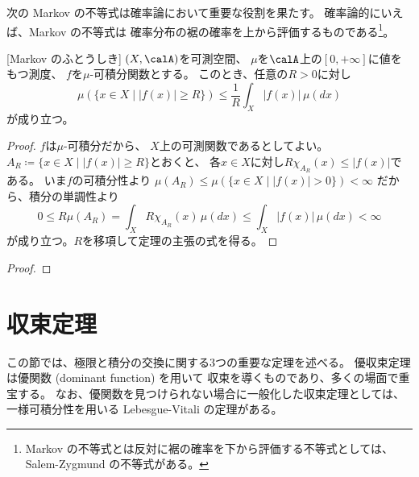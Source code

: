 \documentclass[report]{jlreq}
\begin{document}
次の Markov の不等式は確率論において重要な役割を果たす。
確率論的にいえば、Markov の不等式は
確率分布の裾の確率を上から評価するものである\footnote{
    Markov の不等式とは反対に裾の確率を下から評価する不等式としては、
    Salem-Zygmund の不等式がある\cite[p.142]{Bog07}。
}。

\begin{theorem}
    [Markov のふとうしき]
    $(X, \calA)$を可測空間、
    $\mu$を$\calA$上の$[0, +\infty]$に値をもつ測度、
    $f$を$\mu$-可積分関数とする。
    このとき、任意の$R > 0$に対し
    \begin{equation}
        \mu(\{ x \in X \mid |f(x)| \ge R \})
            \le \frac{1}{R} \int_X |f(x)| \, \mu(dx)
    \end{equation}
    が成り立つ。
\end{theorem}

\begin{proof}
    $f$は$\mu$-可積分だから、
    $X$上の可測関数であるとしてよい。
    $A_R \coloneqq \{ x \in X \mid |f(x)| \ge R \}$とおくと、
    各$x \in X$に対し$R \chi_{A_R}(x) \le |f(x)|$である。
    いま$f$の可積分性より
    $\mu(A_R) \le \mu(\{ x \in X \mid |f(x)| > 0 \}) < \infty$
    だから、積分の単調性より
    \begin{equation}
        0
            \le R \mu(A_R)
            = \int_X R \chi_{A_R}(x) \, \mu(dx)
            \le \int_X |f(x)| \, \mu(dx)
            < \infty
    \end{equation}
    が成り立つ。$R$を移項して定理の主張の式を得る。
\end{proof}

\begin{corollary}
\end{corollary}

\begin{proof}
    \TODO{}
\end{proof}

%
\section{収束定理}

この節では、極限と積分の交換に関する3つの重要な定理を述べる。
優収束定理は優関数 (dominant function) を用いて
収束を導くものであり、多くの場面で重宝する。
なお、優関数を見つけられない場合に一般化した収束定理としては、
一様可積分性を用いる Lebesgue-Vitali の定理がある\cite[p.268]{Bog07}。
\end{document}
